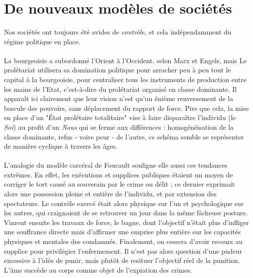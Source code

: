 \section{De nouveaux modèles de sociétés}

\paragraph{} Nos sociétés ont toujours été avides de \emph{contrôle}, et cela indépendamment du régime politique en 
place. 

\paragraph{} \guillemotleft La bourgeoisie a subordonné l'Orient à l'Occident. \guillemotright selon Marx et Engels,
mais \guillemotleft Le prolétariat utilisera sa domination politique pour arracher peu à peu tout le capital à la
bourgeoisie, pour centraliser tous les instruments de production entre les mains de l'Etat, c'est-à-dire du prolétariat
organisé en classe dominante.\guillemotright \cite{Marx1} Il apparaît ici clairement que leur vision
n'est qu'un énième renversement de la bascule des pouvoirs, sans déplacement du rapport de force. Pire que cela, la mise
en place d'un "État prolétaire totalitaire" vise à faire disparaître l'individu (le \emph{Soi}) au profit d'un \emph{Nous}
qui se ferme aux différences : homogénéisation de la classe dominante, refus - voire peur - de l'autre, ce schéma semble
se représenter de manière cyclique à travers les âges.

\paragraph{} L'analogie du modèle carcéral de Foucault souligne elle aussi ces tendances extrêmes.
En effet, les exécutions et supplices publiques étaient un moyen de corriger le tort causé au souverain par le crime ou
délit ; ce dernier exprimait alors une possession pleine et entière de l'individu, et par extension des spectateurs. 
Le contrôle exercé était alors physique sur l'un et psychologique sur les autres, qui craignaient de se retrouver un jour
dans la même fâcheuse posture. Vinrent ensuite les travaux de force, le bagne, dont l'objectif n'était plus d'infliger
une souffrance directe mais d'affirmer une emprise plus entière sur les capacités physiques et mentales des condamnés.
Finalement, on cessera d'avoir recours au supplice pour privilégier l'enfermement. Il n'est pas alors question d'une
pudeur excessive à l'idée de punir, mais plutôt de resituer l'objectif réel de la punition.
\guillemotleft L'âme succède au corps comme objet de l'expiation des crimes. \guillemotright \cite{Foucault0}

